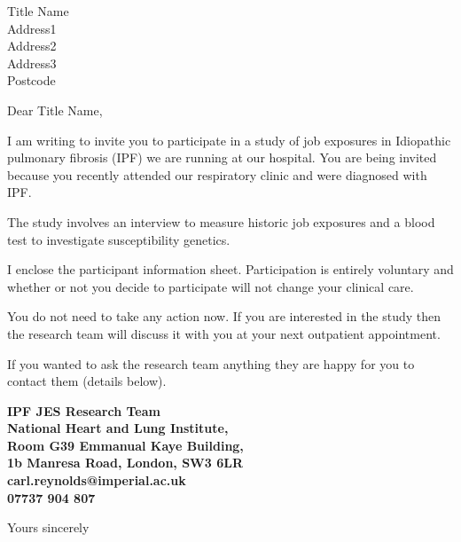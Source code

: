 \documentclass[ipfjes-centre,letterpaper,pagesize,UScommercial9]{scrlttr2}
\begin{document}
\begin{letter}{Title Name \\ Address1 \\ Address2 \\ Address3 \\ Postcode}


\opening{Dear Title Name,}

     I am writing to invite you to participate in a study of job exposures in Idiopathic pulmonary fibrosis (IPF) we are running at our hospital. You are being invited because you recently attended our respiratory clinic and were diagnosed with IPF. 
     
     The study involves an interview to measure historic job exposures and a blood test to investigate susceptibility genetics. 
     
    I enclose the participant information sheet. Participation is entirely voluntary and whether or not you decide to participate will not change your clinical care. 
    
    You do not need to take any action now. If you are interested in the study then the research team will discuss it with you at your next outpatient appointment.

    If you wanted to ask the research team anything they are happy for you to contact them (details below).

    \vspace{1cm}
    \begin{centering}
    \textbf{
    IPF JES Research Team \\  
    National Heart and Lung Institute, \\
    Room G39 Emmanual Kaye Building, \\
    1b Manresa Road, London, SW3 6LR\\
    carl.reynolds@imperial.ac.uk \\
    07737 904 807 \\
    }
    \end{centering}
    \vspace{1cm}

\closing{Yours sincerely}


\end{letter}
\end{document}
